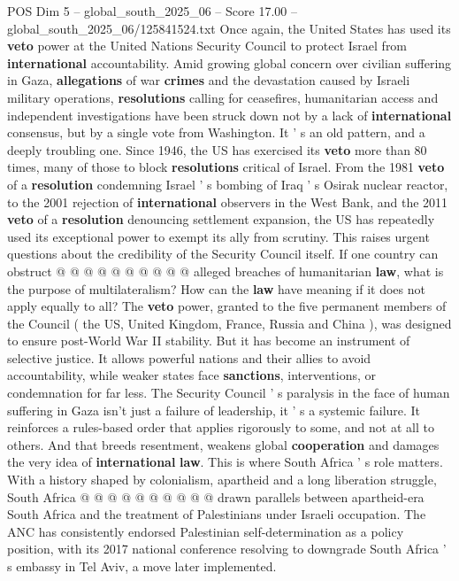 \begin{textsample}{POS Dim 5 – global\_south\_2025\_06 – Score 17.00 – global\_south\_2025\_06/125841524.txt}  \label{ex:f5_pos_046}
Once again, the United States has used its \textbf{veto} power at the United Nations Security Council to protect Israel from \textbf{international} accountability.
Amid growing global concern over civilian suffering in Gaza, \textbf{allegations} of war \textbf{crimes} and the devastation caused by Israeli military operations, \textbf{resolutions} calling for ceasefires, humanitarian access and independent investigations have been struck down not by a lack of \textbf{international} consensus, but by a single vote from Washington.
It ' s an old pattern, and a deeply troubling one.
Since 1946, the US has exercised its \textbf{veto} more than 80 times, many of those to block \textbf{resolutions} critical of Israel.
From the 1981 \textbf{veto} of a \textbf{resolution} condemning Israel ' s bombing of Iraq ' s Osirak nuclear reactor, to the 2001 rejection of \textbf{international} observers in the West Bank, and the 2011 \textbf{veto} of a \textbf{resolution} denouncing settlement expansion, the US has repeatedly used its exceptional power to exempt its ally from scrutiny.
This raises urgent questions about the credibility of the Security Council itself.
If one country can obstruct @ @ @ @ @ @ @ @ @ @ alleged breaches of humanitarian \textbf{law}, what is the purpose of multilateralism?
How can the \textbf{law} have meaning if it does not apply equally to all?
The \textbf{veto} power, granted to the five permanent members of the Council ( the US, United Kingdom, France, Russia and China ), was designed to ensure post-World War II stability.
But it has become an instrument of selective justice.
It allows powerful nations and their allies to avoid accountability, while weaker states face \textbf{sanctions}, interventions, or condemnation for far less.
The Security Council ' s paralysis in the face of human suffering in Gaza isn't just a failure of leadership, it ' s a systemic failure.
It reinforces a rules-based order that applies rigorously to some, and not at all to others.
And that breeds resentment, weakens global \textbf{cooperation} and damages the very idea of \textbf{international} \textbf{law}.
This is where South Africa ' s role matters.
With a history shaped by colonialism, apartheid and a long liberation struggle, South Africa @ @ @ @ @ @ @ @ @ @ drawn parallels between apartheid-era South Africa and the treatment of Palestinians under Israeli occupation.
The ANC has consistently endorsed Palestinian self-determination as a policy position, with its 2017 national conference resolving to downgrade South Africa ' s embassy in Tel Aviv, a move later implemented.

\end{textsample}

